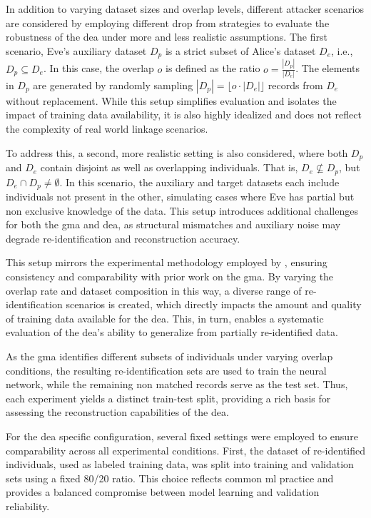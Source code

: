 In addition to varying dataset sizes and overlap levels, different attacker scenarios are considered by employing different drop from strategies to evaluate the robustness of the \ac{dea} under more and less realistic assumptions.
The first scenario, Eve's auxiliary dataset $D_p$ is a strict subset of Alice's dataset $D_e$, i.e., $D_p \subseteq D_e$.
In this case, the overlap $o$ is defined as the ratio $o = \frac{|D_p|}{|D_e|}$.
The elements in $D_p$ are generated by randomly sampling $|D_p| = \lfloor o \cdot |D_e| \rfloor$ records from $D_e$ without replacement.
While this setup simplifies evaluation and isolates the impact of training data availability, it is also highly idealized and does not reflect the complexity of real world linkage scenarios.

To address this, a second, more realistic setting is also considered, where both $D_p$ and $D_e$ contain disjoint as well as overlapping individuals.
That is, $D_e \nsubseteq D_p$, but $D_e \cap D_p \neq \emptyset$.
In this scenario, the auxiliary and target datasets each include individuals not present in the other, simulating cases where Eve has partial but non exclusive knowledge of the data.
This setup introduces additional challenges for both the \ac{gma} and \ac{dea}, as structural mismatches and auxiliary noise may degrade re-identification and reconstruction accuracy.

This setup mirrors the experimental methodology employed by \cite{schaefer2024}, ensuring consistency and comparability with prior work on the \ac{gma}.
By varying the overlap rate and dataset composition in this way, a diverse range of re-identification scenarios is created, which directly impacts the amount and quality of training data available for the \ac{dea}.
This, in turn, enables a systematic evaluation of the \ac{dea}'s ability to generalize from partially re-identified data.

As the \ac{gma} identifies different subsets of individuals under varying overlap conditions, the resulting re-identification sets are used to train the neural network, while the remaining non matched records serve as the test set.
Thus, each experiment yields a distinct train-test split, providing a rich basis for assessing the reconstruction capabilities of the \ac{dea}.

For the \ac{dea} specific configuration, several fixed settings were employed to ensure comparability across all experimental conditions.
First, the dataset of re-identified individuals, used as labeled training data, was split into training and validation sets using a fixed 80/20 ratio.
This choice reflects common \ac{ml} practice and provides a balanced compromise between model learning and validation reliability.


